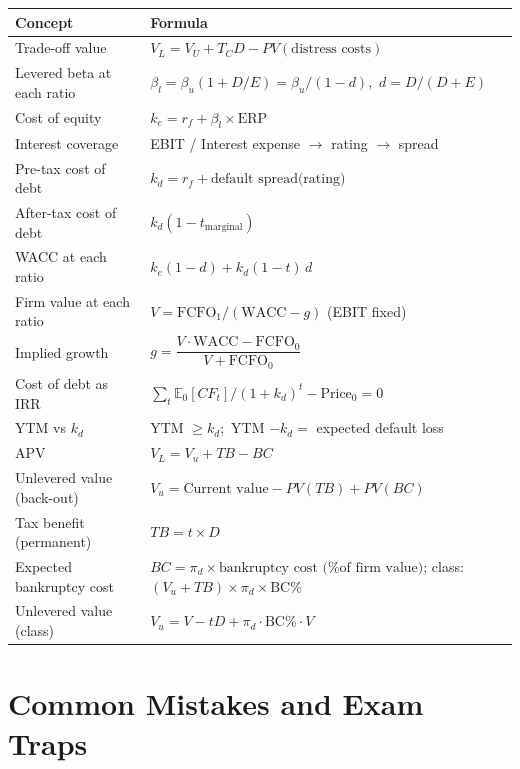 \begin{center}
\small
\renewcommand{\arraystretch}{1.45}
\begin{tabular}{@{}p{5cm}p{10cm}@{}}
\toprule
\textbf{Concept} & \textbf{Formula}\\
\midrule
Trade-off value & $V_L=V_U+T_C D-PV(\text{distress costs})$\\
Levered beta at each ratio & $\beta_l=\beta_u(1+D/E)=\beta_u/(1-d)$,\ $d=D/(D+E)$\\
Cost of equity & $k_e=r_f+\beta_l\times\text{ERP}$\\
Interest coverage & EBIT / Interest expense $\to$ rating $\to$ spread\\
Pre-tax cost of debt & $k_d=r_f+\text{default spread(rating)}$\\
After-tax cost of debt & $k_d(1-t_{\text{marginal}})$\\
WACC at each ratio & $k_e(1-d)+k_d(1-t)\,d$\\
Firm value at each ratio & $V=\text{FCFO}_1/(\text{WACC}-g)$ (EBIT fixed)\\
Implied growth & $g=\dfrac{V\cdot\text{WACC}-\text{FCFO}_0}{V+\text{FCFO}_0}$\\
Cost of debt as IRR & $\sum_t \mathbb{E}_0[CF_t]/(1+k_d)^t-\text{Price}_0=0$\\
YTM vs $k_d$ & YTM $\geq k_d$;\ YTM $-k_d=$ expected default loss\\
APV & $V_L=V_u+TB-BC$\\
Unlevered value (back-out) & $V_u=\text{Current value}-PV(TB)+PV(BC)$\\
Tax benefit (permanent) & $TB=t\times D$\\
Expected bankruptcy cost & $BC=\pi_d\times\text{bankruptcy cost (\% of firm value)}$; class: $(V_u+TB)\times\pi_d\times\text{BC\%}$\\
Unlevered value (class) & $V_u=V-tD+\pi_d\cdot\text{BC\%}\cdot V$\\
\bottomrule
\end{tabular}
\end{center}

\section{Common Mistakes and Exam Traps}


